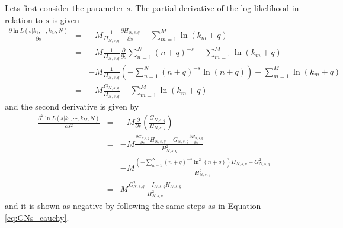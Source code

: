 Lets first consider the parameter $s$. The partial derivative of the log likelihood in relation to $s$ is given  
\begin{eqnarray}
\label{eq:dlnLds1}
\frac{\partial \ln L(s|k_1,\cdots,k_M,N)}{\partial s} &=& -M \frac{1}{H_{N,s,q}} \frac{\partial H_{N,s,q}}{\partial s} - \sum_{m=1}^{M} \ln (k_m + q) \nonumber \\
          &=& -M \frac{1}{H_{N,s,q}} \frac{\partial}{\partial s} \sum_{n=1}^{N} (n+q)^{-s} - \sum_{m=1}^{M} \ln (k_m + q) \nonumber \\
          &=& -M \frac{1}{H_{N,s,q}} \left( -\sum_{n=1}^{N} (n+q)^{-s} \ln (n + q) \right) - \sum_{m=1}^{M} \ln (k_m + q) \nonumber \\
          &=& -M \frac{G_{N,s,q}}{H_{N,s,q}} - \sum_{m=1}^{M} \ln (k_m + q)
\end{eqnarray}
and the second derivative is given by
\begin{eqnarray}
\frac{\partial^2 \ln L(s|k_1,\cdots,k_M,N)}{\partial s^2} &=& -M \frac{\partial}{\partial s} \left( \frac{G_{N,s,q}}{H_{N,s,q}}  \right) \nonumber \\
          &=& -M \frac{\frac{\partial G_{N,s,q}}{\partial s} H_{N,s,q} - G_{N,s,q} \frac{\partial H_{N,s,q}}{\partial s}}{H_{N,s,q}^2} \nonumber \\
          &=& -M \frac{\left( -\sum_{n=1}^{N} (n+q)^{-s} \ln^2(n+q) \right) H_{N,s,q} - G_{N,s,q}^2}{H_{N,s,q}^2} \nonumber \\
          &=& M \frac{G_{N,s,q}^2 - I_{N,s,q} H_{N,s,q}}{H_{N,s,q}^2}
\end{eqnarray}
and it is shown as negative by following the same steps as in Equation \ref{eq:GNs_cauchy}.



